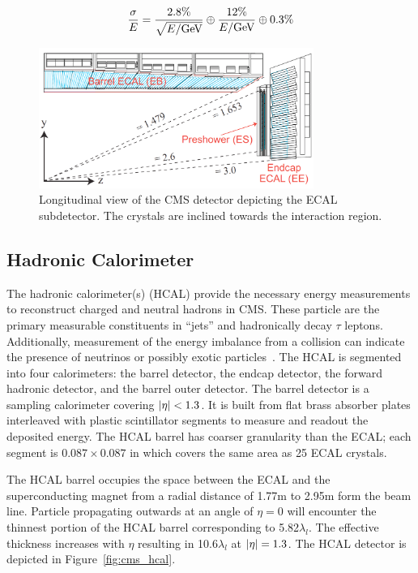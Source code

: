 \begin{equation}
\label{eqn:ecal_res}
\frac{\sigma}{E} = \frac{2.8\%}{\sqrt{E/\mathrm{GeV}}} \oplus \frac{12\%}{E/\mathrm{GeV}} \oplus 0.3\%
\end{equation}



\begin{figure}[htbp]
\centering
     \includegraphics[width=0.8\textwidth]{cms_and_lhc/plots/cms_ecal.png}
     \caption{
Longitudinal view of the CMS detector depicting the ECAL subdetector.
The crystals are inclined towards the interaction region.
     }
     \label{fig:cms_ecal}
\end{figure}



\subsection{Hadronic Calorimeter}
The hadronic calorimeter(s) (HCAL) provide the necessary energy measurements
to reconstruct charged and neutral hadrons in CMS. These particle are the
primary measurable constituents in ``jets'' and hadronically decay $\tau$
leptons. Additionally, measurement of the energy imbalance from a collision
can indicate the presence of neutrinos or possibly exotic particles~\cite{CMS-Proposal}.
The HCAL is segmented into four calorimeters: the barrel detector, the endcap detector,
the forward hadronic detector, and the barrel outer detector. 
The barrel detector is a sampling calorimeter covering $\lvert\eta\rvert < 1.3$. It is built
from flat brass absorber plates interleaved with plastic scintillator segments to
measure and readout the deposited energy. The HCAL barrel has coarser granularity
than the ECAL; each segment is $0.087 \times 0.087$ in \etaphi which covers the
same area as 25 ECAL crystals.

The HCAL barrel occupies the space between the ECAL and the superconducting magnet
from a radial distance of 1.77m to 2.95m form the beam line. Particle propagating
outwards at an angle of $\eta = 0$ will encounter the thinnest portion of the
HCAL barrel corresponding to 5.82$\lambda_{l}$. The effective thickness increases
with $\eta$ resulting in 10.6$\lambda_{l}$ at $\lvert\eta\rvert = 1.3$. The HCAL detector
is depicted in Figure~\ref{fig:cms_hcal}.

